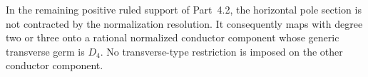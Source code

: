 
\begin{proposition}[P4.54]\hypertarget{tag-02XT}{}\label{night:P4.54}\label{stmt:P4.54}


In the remaining positive ruled support of Part~4.2,
the horizontal pole section is not contracted by the
normalization resolution. It consequently maps with
degree two or three onto a rational normalized conductor
component whose generic transverse germ is $D_4$.
No transverse-type restriction is imposed on the other
conductor component.
\end{proposition}

